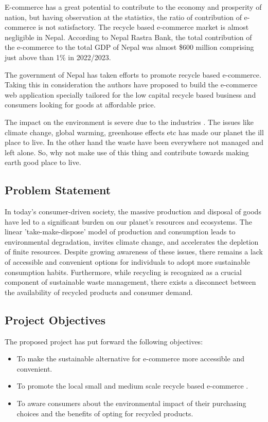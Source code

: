 \documentclass[12pt, a4paper, oneside]{article}
\begin{document}
E-commerce has a great potential to contribute to the economy and prosperity of nation, but having observation at the statistics, the ratio of contribution of e-commerce is not satisfactory. The recycle based e-commerce market is almost negligible in Nepal. According to Nepal Rastra Bank, the total contribution of the e-commerce to the total GDP of Nepal was almost \$600 million comprising just above than 1\% in 2022/2023.

The government of Nepal has taken efforts to promote recycle based e-commerce. Taking this in consideration the authors have proposed to build the e-commerce web application specially tailored for the low capital recycle based business and consumers looking for goods at affordable price.

The impact on the environment is severe due to the industries . The issues like
climate change, global warming, greenhouse effects etc has made our planet the ill place to live. In the other hand the waste have been everywhere not managed and left alone. So, why not make use of this thing and contribute towards making earth good place to live.

\subsection{Problem Statement}
In today's consumer-driven society, the massive production and disposal of goods have led to a significant burden on our planet's resources and ecosystems. The linear 'take-make-dispose' model of production and consumption leads to environmental degradation, invites climate change, and accelerates the depletion of finite resources. Despite growing awareness of these issues, there remains a lack of accessible and convenient options for individuals to adopt more sustainable consumption habits. Furthermore, while recycling is recognized as a crucial component of sustainable waste management, there exists a disconnect between the availability of recycled products and consumer demand.

\subsection{Project Objectives}
The proposed project has put forward the following objectives:

\begin{itemize}
	\item To make the sustainable alternative for e-commerce more accessible and convenient.
	\item To promote the local small and medium scale recycle based e-commerce .
	\item To aware consumers about the environmental impact of their purchasing choices and the benefits of opting for recycled products.
\end{itemize}
\end{document}
